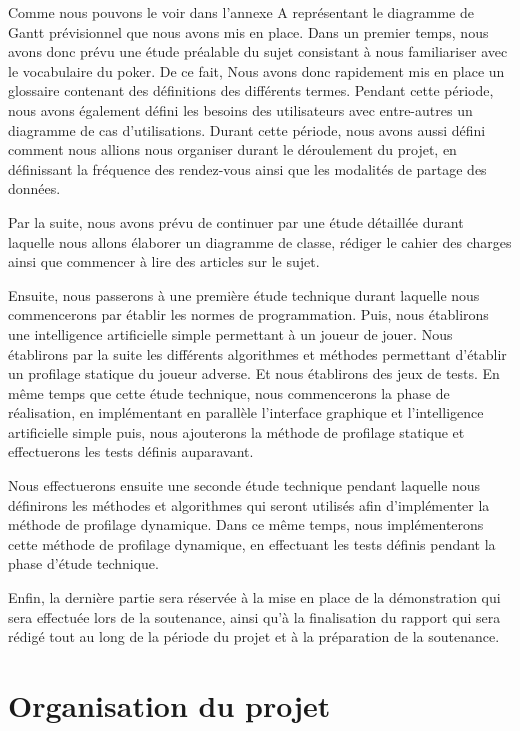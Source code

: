 \documentclass{report}
\begin{document}
\hspace{0.5cm}Comme nous pouvons le voir dans l'annexe A représentant le diagramme de Gantt prévisionnel que nous avons mis en place. Dans un premier temps, nous avons donc prévu une étude préalable du sujet consistant à nous familiariser avec le vocabulaire du poker. De ce fait, Nous avons donc rapidement mis en place un glossaire contenant des définitions des différents termes. Pendant cette période, nous avons également défini les besoins des utilisateurs avec entre-autres un diagramme de cas d'utilisations. Durant cette période, nous avons aussi défini comment nous allions nous organiser durant le déroulement du projet, en définissant la fréquence des rendez-vous ainsi que les modalités de partage des données.\par
Par la suite, nous avons prévu de continuer par une étude détaillée durant laquelle nous allons élaborer un diagramme de classe, rédiger le cahier des charges ainsi que commencer à lire des articles sur le sujet.\par
Ensuite, nous passerons à une première étude technique durant laquelle nous commencerons par établir les normes de programmation. Puis, nous établirons une intelligence artificielle simple permettant à un joueur de jouer. Nous établirons par la suite les différents algorithmes et méthodes permettant d'établir un profilage statique du joueur adverse. Et nous établirons des jeux de tests. En même temps que cette étude technique, nous commencerons la phase de réalisation, en implémentant en parallèle l'interface graphique et l'intelligence artificielle simple puis, nous ajouterons la méthode de profilage statique et effectuerons les tests définis auparavant.\par
Nous effectuerons ensuite une seconde étude technique pendant laquelle nous définirons les méthodes et algorithmes qui seront utilisés afin d'implémenter la méthode de profilage dynamique. Dans ce même temps, nous implémenterons cette méthode de profilage dynamique, en effectuant les tests définis pendant la phase d'étude technique.\par
Enfin, la dernière partie sera réservée à la mise en place de la démonstration qui sera effectuée lors de la soutenance, ainsi qu'à la finalisation du rapport qui sera rédigé tout au long de la période du projet et à la préparation de la soutenance.\par

\chapter{Organisation du projet}
\end{document}
